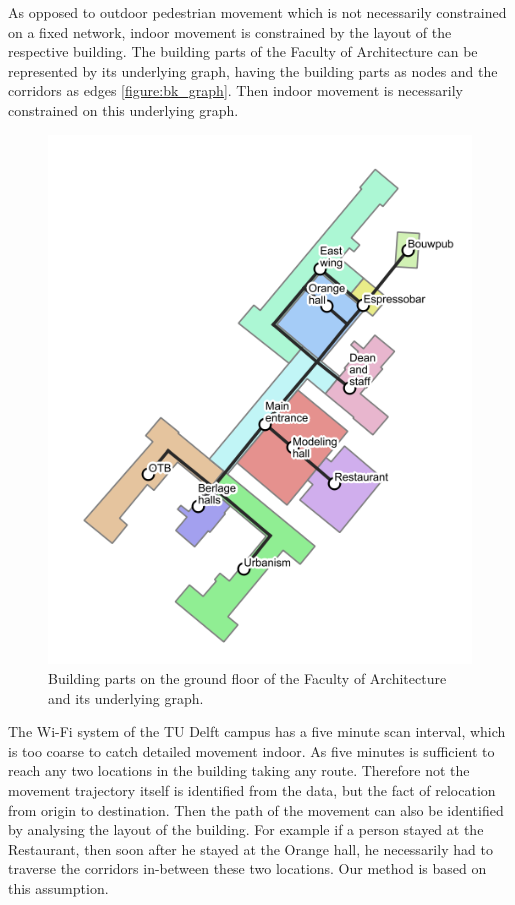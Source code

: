As opposed to outdoor pedestrian movement which is not necessarily constrained
on a fixed network, indoor movement is constrained by the layout of the
respective building. The building parts of the Faculty of Architecture can be
represented by its underlying graph, having the building parts as nodes and the
corridors as edges \autoref{figure:bk_graph}. Then indoor movement is
necessarily constrained on this underlying graph.

\begin{figure}[H]
\centering
\includegraphics[scale=0.8]{bk_BG_bparts.png}
\captionsetup{justification=centering}
\caption{Building parts on the ground floor of the Faculty of Architecture and
its underlying graph.}
\label{figure:bk_graph}
\end{figure}

The Wi-Fi system of the TU Delft campus has a five minute scan interval, which
is too coarse to catch detailed movement indoor. As five minutes is
sufficient to reach any two locations in the building taking any route.
Therefore not the movement trajectory itself is identified from the data, but
the fact of relocation from origin to destination. Then the path of the movement
can also be identified by analysing the layout of the building. For example if a
person stayed at the Restaurant, then soon after he stayed at the Orange hall,
he necessarily had to traverse the corridors in-between these two locations. Our
method is based on this assumption.

